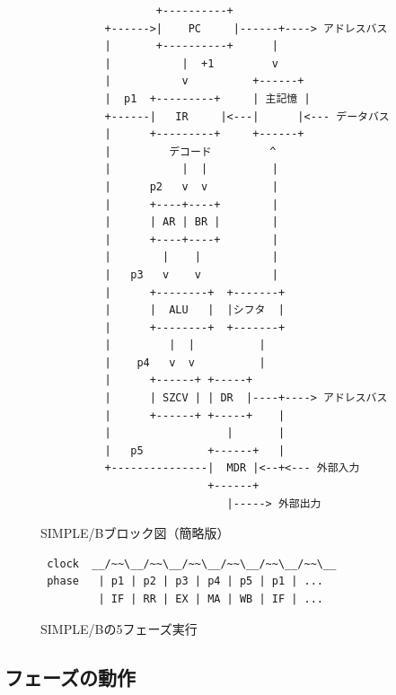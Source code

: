 \documentclass[a4paper,11pt]{ltjsarticle}
\begin{document}
\begin{figure}[h]
\centering
\begin{verbatim}
                  +----------+
          +------>|    PC     |------+----> アドレスバス
          |       +----------+      |
          |           |  +1         v
          |           v          +------+
          |  p1  +---------+     | 主記憶 |
          +------|   IR     |<---|      |<--- データバス
          |      +---------+     +------+
          |         デコード         ^
          |           |  |          |
          |      p2   v  v          |
          |      +----+----+        |
          |      | AR | BR |        |
          |      +----+----+        |
          |        |    |           |
          |   p3   v    v           |
          |      +--------+  +-------+
          |      |  ALU   |  |シフタ  |
          |      +--------+  +-------+
          |         |  |          |
          |    p4   v  v          |
          |      +------+ +-----+
          |      | SZCV | | DR  |----+----> アドレスバス
          |      +------+ +-----+    |
          |                  |       |
          |   p5          +------+   |
          +---------------|  MDR |<--+<--- 外部入力
                          +------+
                             |-----> 外部出力
\end{verbatim}
\caption{SIMPLE/Bブロック図（簡略版）}
\label{fig:block}
\end{figure}

\begin{figure}[h]
\centering
\begin{verbatim}
 clock  __/~~\__/~~\__/~~\__/~~\__/~~\__/~~\__
 phase   | p1 | p2 | p3 | p4 | p5 | p1 | ...
         | IF | RR | EX | MA | WB | IF | ...
\end{verbatim}
\caption{SIMPLE/Bの5フェーズ実行}
\label{fig:phase}
\end{figure}

\subsection{フェーズの動作}
\end{document}
